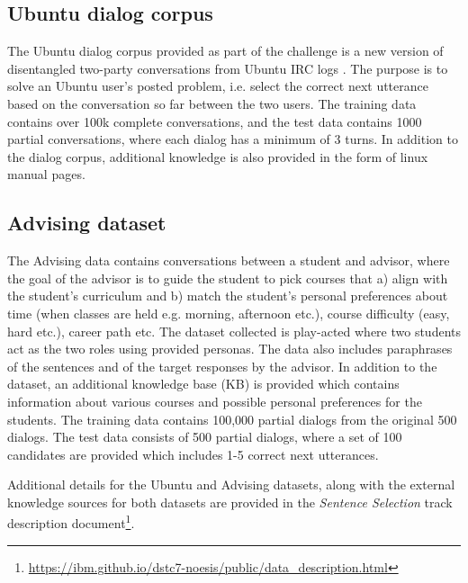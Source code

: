 \documentclass[letterpaper]{article} %
\begin{document}
\subsection{Ubuntu dialog corpus}
\label{Ubuntu-dialog-corpus}
The Ubuntu dialog corpus provided as part of the challenge is a new version of disentangled two-party conversations from Ubuntu IRC logs \cite{kummerfeld2018analyzing}. The purpose is to solve an Ubuntu user's posted problem, i.e. select the correct next utterance based on the conversation so far between the two users. The training data contains over 100k complete conversations, and the test data contains 1000 partial conversations, where each dialog has a minimum of 3 turns. In addition to the dialog corpus, additional knowledge is also provided in the form of linux manual pages.

\subsection{Advising dataset}
\label{Advising-dataset}
The Advising data contains conversations between a student and advisor, where the goal of the advisor is to guide the student to pick courses that a) align with the student's curriculum and b) match the student's personal preferences about time (when classes are held e.g. morning, afternoon etc.), course difficulty (easy, hard etc.), career path etc. The dataset collected is play-acted where two students act as the two roles using provided personas. The data also includes paraphrases of the sentences and of the target responses by the advisor. In addition to the dataset, an additional knowledge base (KB) is provided which contains information about various courses and possible personal preferences for the students. The training data contains 100,000 partial dialogs from the original 500 dialogs. The test data consists of 500 partial dialogs, where a set of 100 candidates are provided which includes 1-5 correct next utterances.

Additional details for the Ubuntu and Advising datasets, along with the external knowledge sources for both datasets are provided in the \textit{Sentence Selection} track description document\footnote{\url{https://ibm.github.io/dstc7-noesis/public/data_description.html}}.
\end{document}
